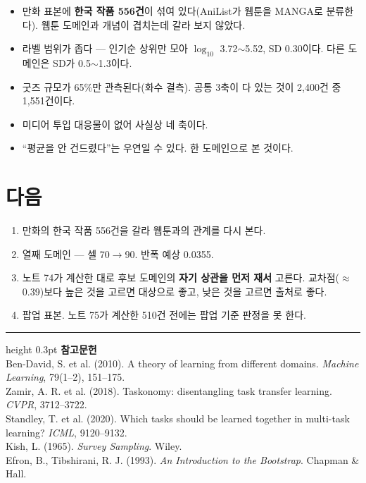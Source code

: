 \documentclass[10pt]{article}
\begin{document}
\begin{itemize}[leftmargin=1.1em,itemsep=0.15em]
\item 만화 표본에 \textbf{한국 작품 556건}이 섞여 있다(AniList가 웹툰을 MANGA로
      분류한다). 웹툰 도메인과 개념이 겹치는데 갈라 보지 않았다.
\item 라벨 범위가 좁다 --- 인기순 상위만 모아 $\log_{10}$ 3.72$\sim$5.52,
      SD 0.30이다. 다른 도메인은 SD가 0.5$\sim$1.3이다.
\item 굿즈 규모가 65\%만 관측된다(화수 결측). 공통 3축이 다 있는 것이
      2,400건 중 1,551건이다.
\item 미디어 투입 대응물이 없어 사실상 네 축이다.
\item ``평균을 안 건드렸다''는 우연일 수 있다. 한 도메인으로 본 것이다.
\end{itemize}

\section{다음}

\begin{enumerate}[leftmargin=1.3em,itemsep=0.15em]
\item 만화의 한국 작품 556건을 갈라 웹툰과의 관계를 다시 본다.
\item 열째 도메인 --- 셀 70$\to$90. 반폭 예상 0.0355.
\item 노트 74가 계산한 대로 후보 도메인의 \textbf{자기 상관을 먼저 재서} 고른다.
      교차점($\approx$0.39)보다 높은 것을 고르면 대상으로 좋고, 낮은 것을
      고르면 출처로 좋다.
\item 팝업 표본. 노트 75가 계산한 510건 전에는 팝업 기준 판정을 못 한다.
\end{enumerate}

\vspace{0.6em}
\hrule height 0.3pt
\vspace{0.5em}
{\footnotesize
\textbf{참고문헌}\\[0.3em]
Ben-David, S. et al. (2010). A theory of learning from different domains.
\emph{Machine Learning}, 79(1--2), 151--175.\\[0.15em]
Zamir, A. R. et al. (2018). Taskonomy: disentangling task transfer learning.
\emph{CVPR}, 3712--3722.\\[0.15em]
Standley, T. et al. (2020). Which tasks should be learned together in multi-task
learning? \emph{ICML}, 9120--9132.\\[0.15em]
Kish, L. (1965). \emph{Survey Sampling}. Wiley.\\[0.15em]
Efron, B., Tibshirani, R. J. (1993). \emph{An Introduction to the Bootstrap}.
Chapman \& Hall.
}
\end{document}
